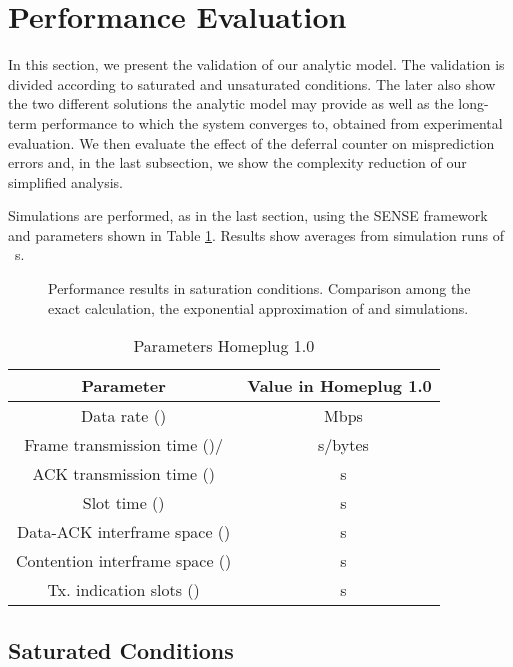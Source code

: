 \documentclass[preprint,12pt]{elsarticle}
\begin{document}
\section{Performance Evaluation}\label{sec:validation}

In this section, we present the validation of our analytic model. The validation is divided according to saturated and unsaturated conditions. The later also show the two different solutions the analytic model may provide as well as the long-term performance to which the system converges to, obtained from experimental evaluation. We then evaluate the effect of the deferral counter on misprediction errors and, in the last subsection, we show the complexity reduction of our simplified analysis.

Simulations are performed, as in the last section, using the SENSE framework and parameters shown in Table \ref{tbl:parameters}. Results show averages from simulation runs of ~s.

\begin{figure*}[ht!!!!!!!!!!]
\centering
{}
\caption{Performance results in saturation conditions. Comparison among the exact calculation, the exponential approximation of  and simulations.}
\label{fig:sat}
\end{figure*}

\begin{table}
\centering
\begin{tabular}{cc} 
Parameter & Value in Homeplug 1.0\\ \hline
Data rate () & ~Mbps \\ \hline
Frame transmission time ()/ & ~s/bytes \\\hline
ACK transmission time () & ~s \\ \hline
Slot time () & ~s \\ \hline
Data-ACK interframe space () & ~s \\\hline
Contention interframe space () & ~s \\ \hline
Tx. indication slots () & ~s \\ \hline
\end{tabular}
\caption{Parameters Homeplug 1.0}\label{tbl:parameters}
\end{table}


\subsection{Saturated Conditions}
\end{document}

